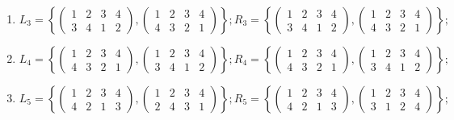 \documentclass[14pt,a4paper]{scrartcl}
\begin{document}
\begin{spacing}{1}
\begin{enumerate}
		\item $L_3 = \left\{ 
		\begin{pmatrix}
		1 & 2 & 3 & 4 \\
		3 & 4 & 1 & 2
		\end{pmatrix},
		\begin{pmatrix}
		1 & 2 & 3 & 4 \\
		4 & 3 & 2 & 1
		\end{pmatrix}
		\right\};
		R_3 = \left\{ 
		\begin{pmatrix}
		1 & 2 & 3 & 4 \\
		3 & 4 & 1 & 2
		\end{pmatrix},
		\begin{pmatrix}
		1 & 2 & 3 & 4 \\
		4 & 3 & 2 & 1
		\end{pmatrix}
		\right\};$
		
		\item $L_4 = \left\{ 
		\begin{pmatrix}
		1 & 2 & 3 & 4 \\
		4 & 3 & 2 & 1
		\end{pmatrix},
		\begin{pmatrix}
		1 & 2 & 3 & 4 \\
		3 & 4 & 1 & 2
		\end{pmatrix}
		\right\};
		R_4 = \left\{ 
		\begin{pmatrix}
		1 & 2 & 3 & 4 \\
		4 & 3 & 2 & 1
		\end{pmatrix},
		\begin{pmatrix}
		1 & 2 & 3 & 4 \\
		3 & 4 & 1 & 2
		\end{pmatrix}
		\right\};$
		
		\item $L_5 = \left\{ 
		\begin{pmatrix}
		1 & 2 & 3 & 4 \\
		4 & 2 & 1 & 3
		\end{pmatrix},
		\begin{pmatrix}
		1 & 2 & 3 & 4 \\
		2 & 4 & 3 & 1
		\end{pmatrix}
		\right\};
		R_5 = \left\{ 
		\begin{pmatrix}
		1 & 2 & 3 & 4 \\
		4 & 2 & 1 & 3
		\end{pmatrix},
		\begin{pmatrix}
		1 & 2 & 3 & 4 \\
		3 & 1 & 2 & 4
		\end{pmatrix}
		\right\};$
		

\end{enumerate}
\end{spacing}
\end{document}
